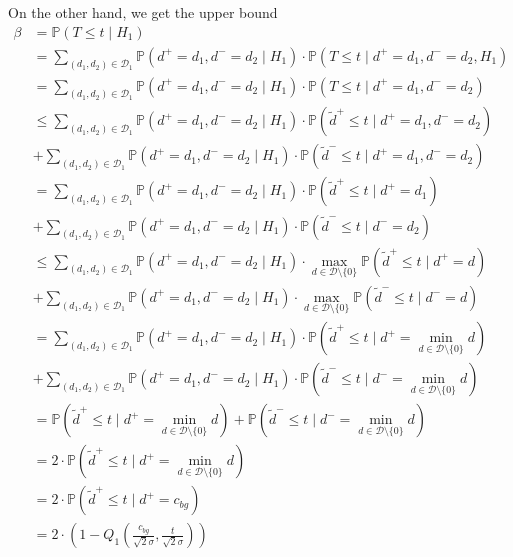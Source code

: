 \documentclass[a4paper,12pt]{article}
\theoremstyle{plain}
\theoremstyle{definition}
\theoremstyle{remark}
\begin{document}
	On the other hand, we get the upper bound
	\begin{align*}
		\beta &= \mathbb{P}(T \leq t \mid H_1) \\
		&= \sum_{(d_1, d_2) \in \mathcal{D}_1} \mathbb{P}(d^+ = d_1, d^- = d_2 \mid H_1) \cdot \mathbb{P}(T \leq t \mid d^+ = d_1, d^- = d_2, H_1) \\
		&= \sum_{(d_1, d_2) \in \mathcal{D}_1} \mathbb{P}(d^+ = d_1, d^- = d_2 \mid H_1) \cdot \mathbb{P}(T \leq t \mid d^+ = d_1, d^- = d_2) \\
		&\leq \sum_{(d_1, d_2) \in \mathcal{D}_1} \mathbb{P}(d^+ = d_1, d^- = d_2 \mid H_1) \cdot \mathbb{P}(\tilde{d}^+ \leq t \mid d^+ = d_1, d^- = d_2) \\
		&+ \sum_{(d_1, d_2) \in \mathcal{D}_1} \mathbb{P}(d^+ = d_1, d^- = d_2 \mid H_1) \cdot \mathbb{P}(\tilde{d}^- \leq t \mid d^+ = d_1, d^- = d_2) \\
		&= \sum_{(d_1, d_2) \in \mathcal{D}_1} \mathbb{P}(d^+ = d_1, d^- = d_2 \mid H_1) \cdot \mathbb{P}(\tilde{d}^+ \leq t \mid d^+ = d_1) \\
		&+ \sum_{(d_1, d_2) \in \mathcal{D}_1} \mathbb{P}(d^+ = d_1, d^- = d_2 \mid H_1) \cdot \mathbb{P}(\tilde{d}^- \leq t \mid d^- = d_2) \\
		&\leq \sum_{(d_1, d_2) \in \mathcal{D}_1} \mathbb{P}(d^+ = d_1, d^- = d_2 \mid H_1) \cdot \max_{d \in \mathcal{D} \setminus \{ 0 \}} \mathbb{P}(\tilde{d}^+ \leq t \mid d^+ = d) \\
		&+ \sum_{(d_1, d_2) \in \mathcal{D}_1} \mathbb{P}(d^+ = d_1, d^- = d_2 \mid H_1) \cdot \max_{d \in \mathcal{D} \setminus \{ 0 \}} \mathbb{P}(\tilde{d}^- \leq t \mid d^- = d) \\
		&= \sum_{(d_1, d_2) \in \mathcal{D}_1} \mathbb{P}(d^+ = d_1, d^- = d_2 \mid H_1) \cdot \mathbb{P}(\tilde{d}^+ \leq t \mid d^+ = \min_{d \in \mathcal{D} \setminus \{ 0 \}} d) \\
		&+ \sum_{(d_1, d_2) \in \mathcal{D}_1} \mathbb{P}(d^+ = d_1, d^- = d_2 \mid H_1) \cdot \mathbb{P}(\tilde{d}^- \leq t \mid d^- = \min_{d \in \mathcal{D} \setminus \{ 0 \}} d) \\
		&= \mathbb{P}(\tilde{d}^+ \leq t \mid d^+ = \min_{d \in \mathcal{D} \setminus \{ 0 \}} d) + \mathbb{P}(\tilde{d}^- \leq t \mid d^- = \min_{d \in \mathcal{D} \setminus \{ 0 \}} d) \\
		&= 2 \cdot \mathbb{P}(\tilde{d}^+ \leq t \mid d^+ = \min_{d \in \mathcal{D} \setminus \{ 0 \}} d) \\
		&= 2 \cdot \mathbb{P}(\tilde{d}^+ \leq t \mid d^+ = c_{bg}) \\
		&= 2 \cdot \left( 1 - Q_1 \left( \frac{c_{bg}}{\sqrt{2} \sigma}, \frac{t}{\sqrt{2} \sigma} \right) \right)
	\end{align*}
	
\end{document}
